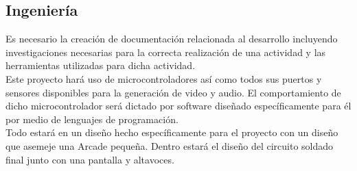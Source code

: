 \documentclass[letterpaper]{article}
\begin{document}
\begin{multicols}{2}
\section{Ingeniería}
Es necesario la creación de documentación relacionada al desarrollo incluyendo
investigaciones necesarias para la correcta realización de una actividad y las
herramientas utilizadas para dicha actividad.\\
Este proyecto hará uso de microcontroladores así como todos sus puertos y
sensores disponibles para la generación de video y audio. El comportamiento de
dicho microcontrolador será dictado por software diseñado específicamente para
él por medio de lenguajes de programación.\\
Todo estará en un diseño hecho específicamente para el proyecto con un diseño
que asemeje una Arcade pequeña. Dentro estará el diseño del circuito soldado
final junto con una pantalla y altavoces.

\end{multicols}
\end{document}
